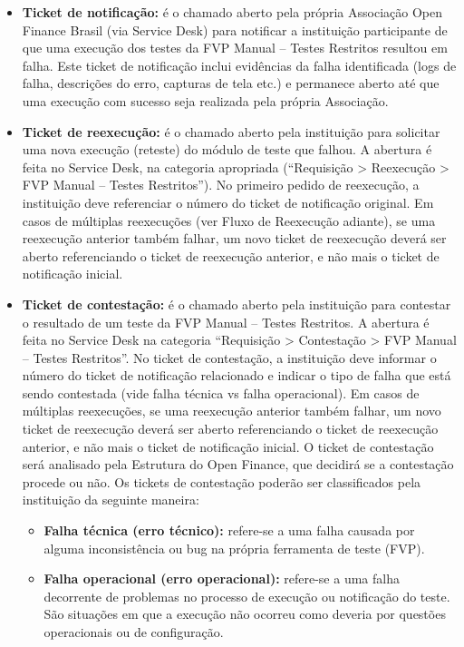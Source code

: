 \begin{itemize}
    \item \textbf{Ticket de notificação:} é o chamado aberto pela própria Associação Open Finance Brasil (via Service Desk) para notificar a instituição participante de que uma execução dos testes da FVP Manual – Testes Restritos resultou em falha. Este ticket de notificação inclui evidências da falha identificada (logs de falha, descrições do erro, capturas de tela etc.) e permanece aberto até que uma execução com sucesso seja realizada pela própria Associação.
    \item \textbf{Ticket de reexecução:} é o chamado aberto pela instituição para solicitar uma nova execução (reteste) do módulo de teste que falhou. A abertura é feita no Service Desk, na categoria apropriada (“Requisição > Reexecução > FVP Manual – Testes Restritos”). No primeiro pedido de reexecução, a instituição deve referenciar o número do ticket de notificação original. Em casos de múltiplas reexecuções (ver Fluxo de Reexecução adiante), se uma reexecução anterior também falhar, um novo ticket de reexecução deverá ser aberto referenciando o ticket de reexecução anterior, e não mais o ticket de notificação inicial.
    \item \textbf{Ticket de contestação:} é o chamado aberto pela instituição para contestar o resultado de um teste da FVP Manual – Testes Restritos. A abertura é feita no Service Desk na categoria “Requisição > Contestação > FVP Manual – Testes Restritos”. No ticket de contestação, a instituição deve informar o número do ticket de notificação relacionado e indicar o tipo de falha que está sendo contestada (vide falha técnica vs falha operacional). Em casos de múltiplas reexecuções, se uma reexecução anterior também falhar, um novo ticket de reexecução deverá ser aberto referenciando o ticket de reexecução anterior, e não mais o ticket de notificação inicial. O ticket de contestação será analisado pela Estrutura do Open Finance, que decidirá se a contestação procede ou não. Os tickets de contestação poderão ser classificados pela instituição da seguinte maneira:
    \begin{itemize}
        \item \textbf{Falha técnica (erro técnico):} refere-se a uma falha causada por alguma inconsistência ou bug na própria ferramenta de teste (FVP).
        \item \textbf{Falha operacional (erro operacional):} refere-se a uma falha decorrente de problemas no processo de execução ou notificação do teste. São situações em que a execução não ocorreu como deveria por questões operacionais ou de configuração.
        

\end{itemize}
\end{itemize}
